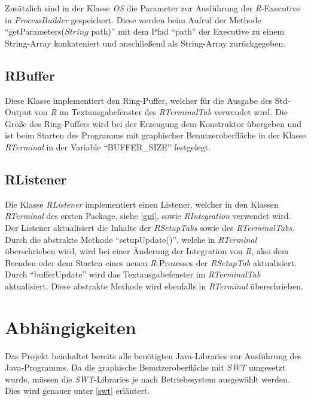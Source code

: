 \documentclass[a4paper, 12pt]{report} %
\begin{document}
Zusätzlich sind in der Klasse \textit{OS} die Parameter zur Ausführung der \textit{R}-Executive in \textit{ProcessBuilder} gespeichert. Diese werden beim Aufruf der Methode "`getParameters($String$ path)"' mit dem Pfad "`path"' der Executive zu einem String-Array konkateniert und anschließend als String-Array zurückgegeben.

\subsection{RBuffer} \label{RBuffer}

Diese Klasse implementiert den Ring-Puffer, welcher für die Ausgabe des Std-Output von \textit{R} im Textausgabefenster des \textit{RTerminalTab} verwendet wird.
Die Größe des Ring-Puffers wird bei der Erzeugung dem Konstruktor übergeben und ist beim Starten des Programms mit graphischer Benutzeroberfläche in der Klasse \textit{RTerminal} in der Variable "`BUFFER\_SIZE"' festgelegt.

\subsection{RListener} \label{RListener}

Die Klasse \textit{RListener} implementiert einen Listener, welcher in den Klassen \textit{RTerminal} des ersten Package, siehe \ref{gui}, sowie \textit{RIntegration} verwendet wird. \\

Der Listener aktualisiert die Inhalte der \textit{RSetupTabs} sowie des \textit{RTerminalTabs}. 
Durch die abstrakte Methode "`setupUpdate()"', welche in \textit{RTerminal} überschrieben wird, wird bei einer Änderung der Integration von \textit{R}, also dem Beenden oder dem Starten eines neuen \textit{R}-Prozesses der \textit{RSetupTab} aktualisiert.
Durch "`bufferUpdate"' wird das Textausgabefenster im \textit{RTerminalTab} aktualisiert. Diese abstrakte Methode wird ebenfalls in \textit{RTerminal} überschrieben.


\section{Abhängigkeiten}

Das Projekt beinhaltet bereits alle benötigten Java-Libraries zur Ausführung des Java-Programms. 
Da die graphische Benutzeroberfläche mit \textit{SWT} umgesetzt wurde, müssen die \textit{SWT}-Libraries je nach Betriebssystem ausgewählt werden. Dies wird genauer unter \ref{swt} erläutert.\\
\end{document}

